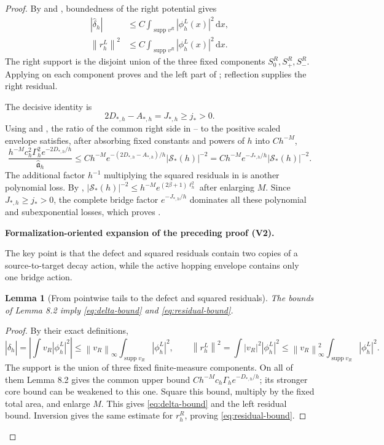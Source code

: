 \documentclass[11pt]{article}
\newtheorem{lemma}[theorem]{Lemma}
\newcommand{\formalisationparentid}{X}
\newenvironment{formalisationaddition}[1]{\par\medskip\begingroup\color{blue}\def\formalisationparentid{#1}\setcounter{formalizationsublemma}{0}\let\lemma\formalizationsublemma\let\endlemma\endformalizationsublemma
  \def\Eo{\mathcal E_h^\circ}\def\EE{\mathcal E_h}\def\phio{\phi_h^\circ}\def\phih{\phi_h}\def\Ho{H_h^{\rm atom}(v^\circ)}\def\Ha{H_h^{\rm atom}}\def\HL{H_h^{L}}\def\Dh{D_h}\def\Log{\operatorname{Log}}\def\ellh{\ell_h}\def\Gp{G_{p,h}}\def\Ast{A_{*,h}}\def\ahat{\widehat{\mathfrak a}_h}\def\ah{\mathfrak a_h}\def\rh{\widehat\rho_h}\def\deltah{\widehat\delta_h}\def\oldref##1{\textup{(##1)}}\def\interface##1{\par\noindent\textit{Analytical interface used here.} ##1\par}\def\finish{\par\noindent\textit{Conclusion of the formalization-oriented expansion.} }\par\noindent\textbf{Formalization-oriented expansion of the preceding proof (V2).}\par\smallskip
}{\par\endgroup\medskip
}
\newcommand{\dd}{\,\mathrm d}
\newcommand{\norm}[1]{\left\|#1\right\|}
\newcommand{\supp}{\operatorname{supp}}
\begin{document}
\begin{proof}
By  and , boundedness of the
right potential gives
\begin{align*}
 |\widehat\delta_h|
 &\le C\int_{\supp v^R}|\phi_h^L(x)|^2\dd x,\\
 \norm{r_h^L}^2
 &\le C\int_{\supp v^R}|\phi_h^L(x)|^2\dd x.
\end{align*}
The right support is the disjoint union of the three fixed components
$S_0^R,S_+^R,S_-^R$.  Applying  on each
component proves  and the left part of
; reflection supplies the right residual.

The decisive identity is
\begin{equation}\label{eq:twoDminusA}
 2D_{*,h}-A_{*,h}=J_{*,h}\ge j_*>0.
\end{equation}
Using  and , the ratio of
the common right side in --
to the positive scaled envelope satisfies, after absorbing fixed constants and
powers of $h$ into $Ch^{-M}$,
\[
 \frac{h^{-M}c_h^2\Gamma_h^2e^{-2D_{*,h}/h}}
 {\widehat{\mathfrak a}_h}
 \le Ch^{-M}
 e^{-(2D_{*,h}-A_{*,h})/h}|\mathcal S_*(h)|^{-2}
 =Ch^{-M}e^{-J_{*,h}/h}|\mathcal S_*(h)|^{-2}.
\]
The additional factor $h^{-1}$ multiplying the squared residuals in
 is another polynomial loss.  By
,
$|\mathcal S_*(h)|^{-2}\le h^{-M}e^{(2\beta+1)\ell_h^2}$ after enlarging
$M$.  Since $J_{*,h}\ge j_*>0$, the complete bridge factor
$e^{-J_{*,h}/h}$ dominates all these polynomial and subexponential losses,
which proves .

\begin{formalisationaddition}{T8.3}
The key point is that the defect and squared residuals contain two copies of a source-to-target decay action, while the active hopping envelope contains only one bridge action.

\begin{lemma}[From pointwise tails to the defect and squared residuals]\label{sublemma:T8-3-squares}
The bounds of Lemma 8.2 imply \eqref{eq:delta-bound} and \eqref{eq:residual-bound}.
\end{lemma}
\begin{proof}
By their exact definitions,
\[
 |\deltah|=\left|\int v_R|\phi_h^L|^2\right|
 \le\norm{v_R}_\infty\int_{\supp v_R}|\phi_h^L|^2,
\qquad
 \norm{r_h^L}^2=\int |v_R|^2|\phi_h^L|^2
 \le\norm{v_R}_\infty^2\int_{\supp v_R}|\phi_h^L|^2.
\]
The support is the union of three fixed finite-measure components. On all of them Lemma 8.2 gives the common upper bound $Ch^{-M}c_h\Gamma_he^{-D_{*,h}/h}$; its stronger core bound can be weakened to this one. Square this bound, multiply by the fixed total area, and enlarge $M$. This gives \eqref{eq:delta-bound} and the left residual bound. Inversion gives the same estimate for $r_h^R$, proving \eqref{eq:residual-bound}.
\end{proof}


\end{formalisationaddition}
\end{proof}
\end{document}
